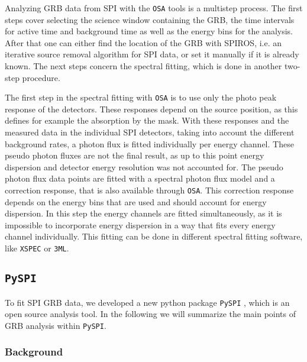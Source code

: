 \documentclass[twocolumn]{aa}
\begin{document}
Analyzing GRB data from SPI with the {\tt OSA} tools is a multistep process. The first steps cover selecting the science window containing the GRB, the time intervals for active time and background time as well as the energy bins for the analysis. After that one can either find the location of the GRB with SPIROS, i.e. an iterative source removal algorithm for SPI data, or set it manually if it is already known. The next steps concern the spectral fitting, which is done in another two-step procedure.

The first step in the spectral fitting with {\tt OSA} is to use only the photo peak response of the detectors. These responses depend on the source position, as this defines for example the absorption by the mask. With these responses and the measured data in the individual SPI detectors, taking into account the different background rates, a photon flux is fitted individually per energy channel. These pseudo photon fluxes are not the final result, as up to this point energy dispersion and detector energy resolution was not accounted for.
The pseudo photon flux data points are fitted with a spectral photon flux model and a correction response, that is also available through {\tt OSA}. This correction response depends on the energy bins that are used and should account for energy dispersion. In this step the energy channels are fitted simultaneously, as it is impossible to incorporate energy dispersion in a way that fits every energy channel individually. This fitting can be done in different spectral fitting software, like {\tt XSPEC} or {\tt 3ML}.


\subsection{{\tt PySPI}}
\label{pyspi}
To fit SPI GRB data, we developed a new python package {\tt PySPI} \citep{joss}, which is an open source analysis tool. In the following we will summarize the main points of GRB analysis within {\tt PySPI}.

\subsubsection{Background}
\end{document}
